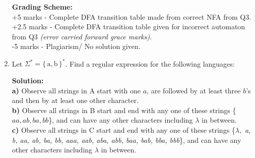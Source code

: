 \documentclass[11pt, article, oneside]{memoir}
\newcommand{\set}[1]{\{\, #1\, \}}
\DeclarePairedDelimiter\abs{\lvert}{\rvert}
\begin{document}
\begin{enumerate}
        \textbf{Grading Scheme:}
        \\+5 marks - Complete DFA transition table made from correct NFA from Q3.
        \\+2.5 marks - Complete DFA transition table given for incorrect automaton from Q3 \textit{(error carried forward grace marks)}.
        \\-5 marks -  Plagiarism/ No solution given.
        
    \item
        Let \(\Sigma^* = \set{\text{a}, \text{b}}^*\). Find a regular expression for the following languages:

        \textbf{Solution:}
        \\\textbf{a)} Observe all strings in A start with one \(a\), are followed by at least three \(b\)'s and then by at least one other character.
        \\\textbf{b)} Observe all strings in B start and end with any one of these strings \{\(aa, ab, ba, bb\)\}, and can have any other characters including \(\lambda\) in between.
        \\\textbf{c)} Observe all strings in C start and end with any one of these strings
        \{\(\lambda,\) \textit{a, b, aa, ab, ba, bb, aaa, aab, aba, abb, baa, bab, bba, bbb}\},
        and can have any other characters including \(\lambda\) in between.


\end{enumerate}
\end{document}
